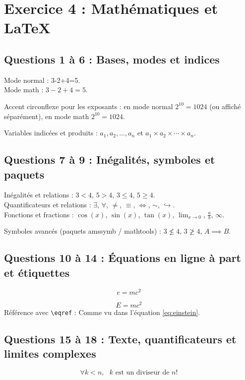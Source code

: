 \documentclass{article}
\begin{document}
\section{Exercice 4 : Mathématiques et LaTeX}

\subsection{Questions 1 à 6 : Bases, modes et indices}
Mode normal : 3-2+4=5. \\
Mode math : $3-2+4=5$.

Accent circonflexe pour les exposants : en mode normal $2^{10}=1024$ (ou affiché séparément), en mode math $2^{10} = 1024$.

Variables indicées et produits : 
$a_1, a_2, \dots, a_n$ et $a_1 \times a_2 \times \cdots \times a_n$.

\subsection{Questions 7 à 9 : Inégalités, symboles et paquets}
Inégalités et relations : $3 < 4$, $5 > 4$, $3 \leq 4$, $5 \geq 4$. \\
Quantificateurs et relations : $\exists$, $\forall$, $\neq$, $\equiv$, $\iff$, $\sim$, $\hookrightarrow$. \\
Fonctions et fractions : $\cos(x)$, $\sin(x)$, $\tan(x)$, $\lim_{x \to 0}$, $\frac{a}{b}$, $\infty$.

Symboles avancés (paquets amssymb / mathtools) : 
$3 \nleq 4$, $3 \ngeq 4$, $A \implies B$.

\subsection{Questions 10 à 14 : Équations en ligne à part et étiquettes}
\begin{equation*}
    e = mc^2
\end{equation*}

\begin{equation}
    \label{eq:einstein}
    E = mc^2
\end{equation}
Référence avec \verb|\eqref| : Comme vu dans l'équation \eqref{eq:einstein}.

\subsection{Questions 15 à 18 : Texte, quantificateurs et limites complexes}
\begin{equation}
    \forall k < n, \text{ $k$ est un diviseur de } n!
\end{equation}
\end{document}
